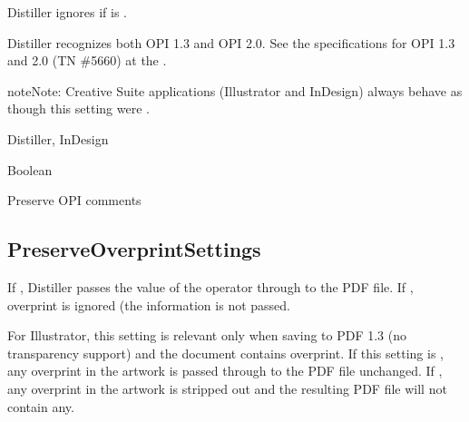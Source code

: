 \documentclass[letterpaper,12pt,english,openany,oneside]{sphinxmanual}
\begin{document}
Distiller ignores  if  is  .

Distiller recognizes both OPI 1.3 and OPI 2.0. See the specifications for OPI 1.3 and 2.0 (TN \#5660) at the  .

\begin{sphinxadmonition}{note}{Note:}
Creative Suite applications (Illustrator and InDesign) always behave as though this setting were  .
\end{sphinxadmonition}
\label{\detokenize{PDF_Create_CommonSettings:supported-by-105}}

Distiller, InDesign

\label{\detokenize{PDF_Create_CommonSettings:type-104}}

Boolean

\label{\detokenize{PDF_Create_CommonSettings:ui-name-86}}

Preserve OPI comments

\label{\detokenize{PDF_Create_CommonSettings:default-value-99}}

\begin{sphinxVerbatim}[commandchars=\\\{\}]
\end{sphinxVerbatim}




\subsection{PreserveOverprintSettings}
\label{\detokenize{PDF_Create_CommonSettings:preserveoverprintsettings}}
If  , Distiller passes the value of the  operator through to the PDF file. If  , overprint is ignored (the information is not passed.

For Illustrator, this setting is relevant only when saving to PDF 1.3 (no transparency support) and the document contains overprint. If this setting is  , any overprint in the artwork is passed through to the PDF file unchanged. If  , any overprint in the artwork is stripped out and the resulting PDF file will not contain any.
\end{document}
